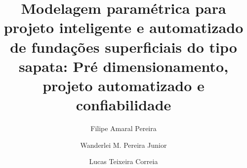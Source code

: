 \documentclass[preprint,11pt]{elsarticle}
\theoremstyle{plain}
\theoremstyle{definition}
\theoremstyle{remark}
\begin{document}
\begin{frontmatter}

\title{Modelagem paramétrica para projeto inteligente e automatizado de fundações superficiais do tipo sapata: Pré dimensionamento, projeto automatizado e confiabilidade}

\author[label1]{Filipe Amaral Pereira}
\author[label1]{Wanderlei M. Pereira Junior}
\author[label2]{  }
\author[label3]{  }
\author[label4]{Lucas Teixeira Correia}

\address[label1]{Federal University of Catalão, Engineering College, Av. Dr. Lamartine Pinto de Avelar, 1120, Catalão, 75704-020, Brazil}
\address[label2]{University of São Paulo – School of Engineering of São Carlos, Av. Trabalhador São Carlense, 400 – Parque Arnold Schimidt, São Carlos – SP, 13566-590, Brazil}
\address[label3]{Federal University of Goiás – School of Civil and Environmental Engineering, Avenida Universitária, Quadra 86, Lote Área 1488 – Setor Leste Universitário, Goiânia – GO, 74605-220, Brazil}
\address[label4]{Pontifical Catholic University of Goiás – School of Engineering, Avenida Universitária, 1440 – Setor Universitário, Goiânia – GO, 74605-010, Brazil}



\end{frontmatter}
\end{document}
